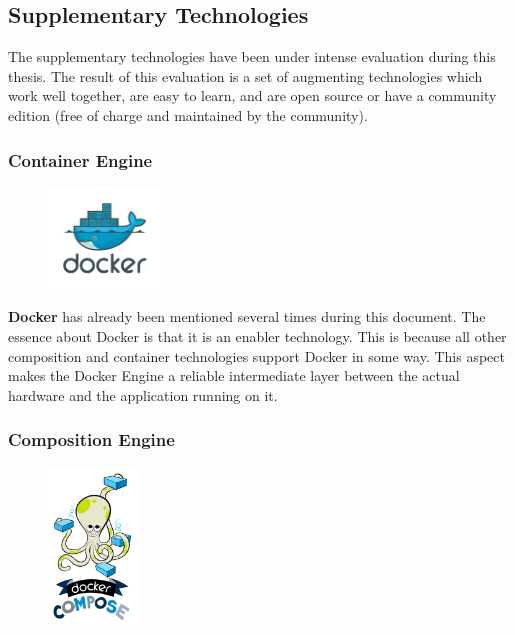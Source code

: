 \subsection{Supplementary Technologies}

The supplementary technologies have been under intense evaluation during this
thesis. The result of this evaluation is a set of augmenting technologies which
work well together, are easy to learn, and are open source or have a community
edition (free of charge and maintained by the community).

\subsubsection{Container Engine}

\begin{figure}
	\vspace*{-0.5cm} \hspace*{0.2cm}
    \includegraphics[width=3cm]{images/dependencies/docker}
\end{figure}

\textbf{Docker} has already been mentioned several times during this document.
The essence about Docker is that it is an enabler technology. This is because all
other composition and container technologies support Docker in some way. This
aspect makes the Docker Engine a reliable intermediate layer between the actual
hardware and the application running on it.


\subsubsection{Composition Engine}

\begin{figure}
	\vspace*{-0.5cm} \hspace*{0.4cm}
    \includegraphics[width=2.4cm]{images/dependencies/docker-compose}
\end{figure}

